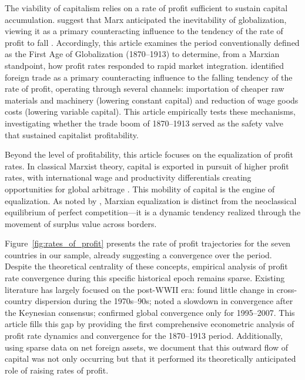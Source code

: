 \documentclass[10pt]{article}
\begin{document}
\par The viability of capitalism relies on a rate of profit sufficient to sustain capital accumulation. \citet{JellissenGottheil2009} suggest that Marx anticipated the inevitability of globalization, viewing it as a primary counteracting influence to the tendency of the rate of profit to fall \citep{moseley1997rate, moseley2009us}. Accordingly, this article examines the period conventionally defined as the First Age of Globalization (1870--1913) to determine, from a Marxian standpoint, how profit rates responded to rapid market integration. \citet{marx1894-counteracting} identified foreign trade as a primary counteracting influence to the falling tendency of the rate of profit, operating through several channels: importation of cheaper raw materials and machinery (lowering constant capital) and reduction of wage goods costs (lowering variable capital). This article empirically tests these mechanisms, investigating whether the trade boom of 1870--1913 served as the safety valve that sustained capitalist profitability.

\par Beyond the level of profitability, this article focuses on the equalization of profit rates. In classical Marxist theory, capital is exported in pursuit of higher profit rates, with international wage and productivity differentials creating opportunities for global arbitrage \citep{hilferding1981finance, lenin1999imperialism, bukharin1929imperialism}. This mobility of capital is the engine of equalization. As noted by \citet{ChouIzyumovVahaly2015}, Marxian equalization is distinct from the neoclassical equilibrium of perfect competition---it is a dynamic tendency realized through the movement of surplus value across borders.

\par Figure~\ref{fig:rates_of_profit} presents the rate of profit trajectories for the seven countries in our sample, already suggesting a convergence over the period. Despite the theoretical centrality of these concepts, empirical analysis of profit rate convergence during this specific historical epoch remains sparse. Existing literature has largely focused on the post-WWII era: \citet{Glyn2004} found little change in cross-country dispersion during the 1970s--90s; \citet{Carter2004} noted a slowdown in convergence after the Keynesian consensus; \citet{ChouIzyumovVahaly2015} confirmed global convergence only for 1995--2007. This article fills this gap by providing the first comprehensive econometric analysis of profit rate dynamics and convergence for the 1870--1913 period. Additionally, using sparse data on net foreign assets, we document that this outward flow of capital was not only occurring but that it performed its theoretically anticipated role of raising rates of profit. 
\end{document}
